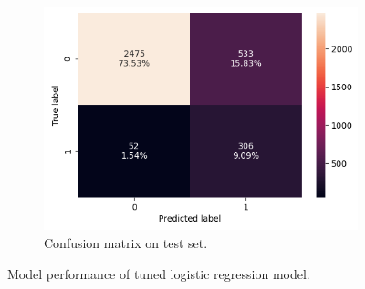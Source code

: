 \documentclass[12pt,a4paper]{article}
\begin{document}
\begin{figure}[h]
\begin{subfigure}[t]{0.45\textwidth}
			\includegraphics[width=\textwidth]{lg2_c_Matrix_test.png}
			\caption{Confusion matrix on test set.}
			\label{fig: lg2_c_Matrix_test}
		\end{subfigure}
		\caption{Model performance of tuned logistic regression model.}
		\label{fig:Model performance of tuned logistic regression model}
	\end{figure}
	\clearpage
\end{document}
